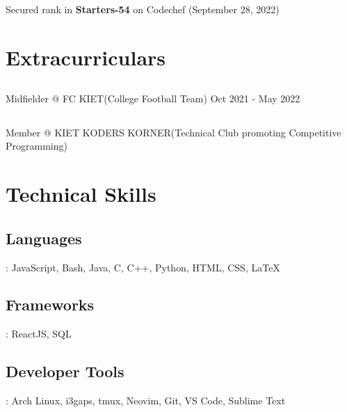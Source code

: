 \documentclass[a4paper,11pt]{article}
\begin{document}
    \subsection{}\hspace{0.5em}Secured \textbf{} rank in \textbf{Starters-54} on Codechef (September 28, 2022)



	\vspace{-1.1em}
	


	\section{Extracurriculars}
	
    \subsection{}\hspace{0.5em}Midfielder @ FC KIET(College Football Team) \textbar{} Oct 2021 - May 2022  
	\subsection{}\hspace{0.5em}Member @ KIET KODERS KORNER(Technical Club promoting Competitive Programming) 
	

    \vspace{-1.1em}



	\section{Technical Skills}
	\subsection{Languages}: JavaScript, Bash, Java, C, C++, Python, HTML, CSS, \LaTeX
	\subsection{Frameworks}: ReactJS, SQL
	\subsection{Developer Tools}: Arch Linux, i3gaps, tmux, Neovim, Git, VS Code, Sublime Text
	
\end{document}
